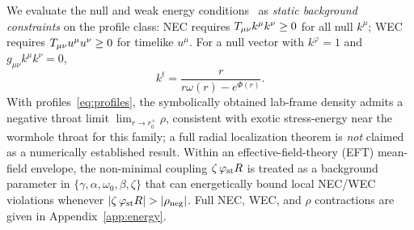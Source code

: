 We evaluate the null and weak energy conditions~\cite{HawkingEllis1973,Visser1995} as
\emph{static background constraints} on the profile class: NEC requires
$T_{\mu\nu} k^{\mu}k^{\nu}\ge 0$ for all null $k^{\mu}$; WEC requires
$T_{\mu\nu} u^{\mu}u^{\nu}\ge 0$ for timelike $u^{\mu}$.
For a null vector with $k^{\varphi}=1$ and $g_{\mu\nu}k^{\mu}k^{\nu}=0$,
\begin{equation}
  k^t = \frac{r}{r \omega{\left(r \right)} - e^{\Phi{\left(r \right)}}}.
\end{equation}
With profiles~\eqref{eq:profiles}, the symbolically obtained lab-frame density admits a
negative throat limit $\lim_{r\to r_0^{+}}\rho$, consistent with exotic stress-energy
near the wormhole throat for this family; a full radial localization theorem is
\emph{not} claimed as a numerically established result.
Within an effective-field-theory (EFT) mean-field envelope, the non-minimal coupling
$\zeta\,\varphi_{\mathrm{st}} R$ is treated as a background parameter in
$\{\gamma,\alpha,\omega_{0},\beta,\zeta\}$ that can energetically bound local
NEC/WEC violations whenever $|\zeta\,\phif R|>|\rho_{\mathrm{neg}}|$.
Full NEC, WEC, and $\rho$ contractions are given in Appendix~\ref{app:energy}.
